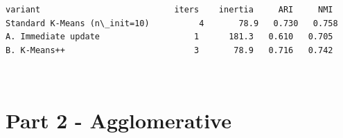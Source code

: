 \documentclass[11pt]{article}
\begin{document}
    \begin{Verbatim}[commandchars=\\\{\}]
variant                           iters    inertia     ARI     NMI
Standard K-Means (n\_init=10)          4       78.9   0.730   0.758
A. Immediate update                   1      181.3   0.610   0.705
B. K-Means++                          3       78.9   0.716   0.742
    \end{Verbatim}

    \begin{center}
    \end{center}
    { \hspace*{\fill} \\}
    
    \section{Part 2 - Agglomerative}\label{part-2---agglomerative}
\end{document}
